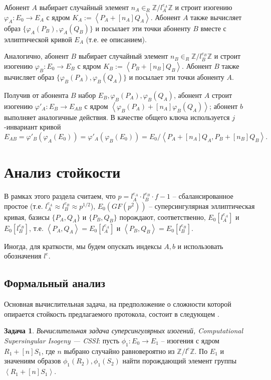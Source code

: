 \documentclass[a4paper,12pt]{article}
\newcommand{\ZZ}{\mathbb{Z}}
\newcommand{\tr}[1]{\left\langle #1\right\rangle}
\theoremstyle{definition}
\newtheorem{problem}{Задача}
\begin{document}
 Абонент $A$ выбирает  случайный элемент $ n_A\in_R\ZZ/l_A^{e_A}\ZZ$ %
 и строит изогению $\varphi_A:E_0\to E_A$ с ядром $K_A:=\tr{ P_A+[n_A]Q_A}$.  Абонент $A$  также вычисляет образ $\{\varphi_A(P_B),\varphi_A(Q_B)\}$ и посылает эти точки абоненту $B$ вместе с эллиптической кривой $E_A$ (т.е. ее описанием).
 
 Аналогично, абонент $B$ выбирает   случайный элемент  $ n_B\in_R\ZZ/l_B^{e_B}\ZZ$ %
 и строит изогению $\varphi_B:E_0\to E_B$ с ядром $K_B:=\tr{ P_B+[n_B]Q_B}$.  Абонент $B$  также вычисляет образ $\{\varphi_B(P_A),\varphi_B(Q_A)\}$ и посылает эти точки абоненту $A$.
 
 Получив от абонента $B$ набор $E_B, \varphi_B(P_A),\varphi_B(Q_A)$, абонент $A$ строит изогению $\varphi'_A:E_B\to E_{AB}$ с ядром $\tr{ \varphi_B(P_A)+[n_A]\varphi_B(Q_A)}$; абонент $b$ выполняет аналогичные действия.
 В качестве общего ключа  используется $j$-инвариант кривой
 $$
 E_{AB}=\varphi'_B(\varphi_A(E_0))=\varphi'_A(\varphi_B(E_0))=E_0/\tr{ P_A+[n_A]Q_A,  P_B+[n_B]Q_B }.
 $$

\section{Анализ стойкости}\label{analysis}

В рамках этого раздела считаем, что $p=l_A^{e_A}\cdot l_B^{e_B}\cdot f-1$ -- сбалансированное простое (т.е. $l_A^{e_A}\approx l_B^{e_B}\approx p^{1/2}$), $E_0(GF(p^2))$ -- суперсингулярная эллиптическая кривая, базисы $\{P_A,Q_A\}$ и $\{P_B,Q_B\}$
порождают, соответственно, $E_0[l_A^{e_A}]$ и $E_0[l_B^{e_B}]$, т.е. $\tr{P_A,Q_A}=E_0[l_A^{e_A}]$ и $\tr{P_B,Q_B}=E_0[l_B^{e_B}]$. 

Иногда, для краткости, мы будем опускать индексы $A, b$ и использовать обозначения $l^e$.

\subsection{Формальный анализ}

Основная вычислительная задача, на предположение о сложности которой опирается стойкость предлагаемого протокола, состоит в следующем \cite{DF}.

\begin{problem}\label{problem31} \emph{Вычислительная задача суперсингулярных изогений, Computational Supersingular Isogeny --- CSSI}: пусть $\phi_1: E_0 \to E_1$ -- изогения с ядром
$R_1 + [n]S_1$, где   $n $ выбрано случайно равновероятно из $\ZZ/l^{e}\ZZ$. По $E_1$ и значениям образов $\phi_1(R_2), \phi_1(S_2)$ найти порождающий элемент группы $\tr{R_1+[n]S_1}$.
\end{problem}
\end{document}
